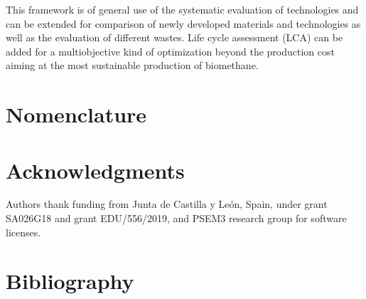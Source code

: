 \begin{refsection}[referencesCh7]
This framework is of general use of the systematic evaluation of technologies and can be extended for comparison of newly developed materials and technologies as well as the evaluation of different wastes. Life cycle assessment (LCA) can be added for a multiobjective kind of optimization beyond the production cost aiming at the most sustainable production of biomethane.


\section*{Nomenclature}

\vspace{-0.8cm}
\begingroup     
\let\clearpage\relax
%

%
\glsaddall
\setlength\LTleft{0pt}
\setlength\LTright{0pt}
\setlength\glsdescwidth{0.8\hsize}
\renewcommand*{\glossarypreamble}{\vspace{-0.8cm}}
\printglossary[type=VarCh7, style=long] %
\vspace{10pt}
\printglossary[type=UnitsCh7, style=long]
\vspace{10pt}
\printglossary[type=SubscriptsCh7, style=long]
\vspace{10pt}
\printglossary[type=AcroCh7, style=long]
\endgroup

\section*{Acknowledgments} \label{section:Ch7Acknowledgments}
Authors thank funding from Junta de Castilla y León, Spain, under grant SA026G18 and grant EDU/556/2019, and PSEM3 research group for software licenses.


\section*{Bibliography}

\printbibliography[heading=none]
\end{refsection}